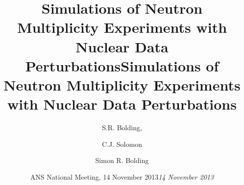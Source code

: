 

\title{Simulations of Neutron Multiplicity Experiments with Nuclear Data Perturbations}
\author{S.R. Bolding, \and C.J. Solomon}

\date{ANS National Meeting, 14 November 2013}%


\date{}

\author{}\vspace{-0.50cm}


\date{\textit{14 November 2013}}%
\author{Simon R. Bolding}
\title{Simulations of Neutron Multiplicity Experiments with Nuclear Data Perturbations}

%


